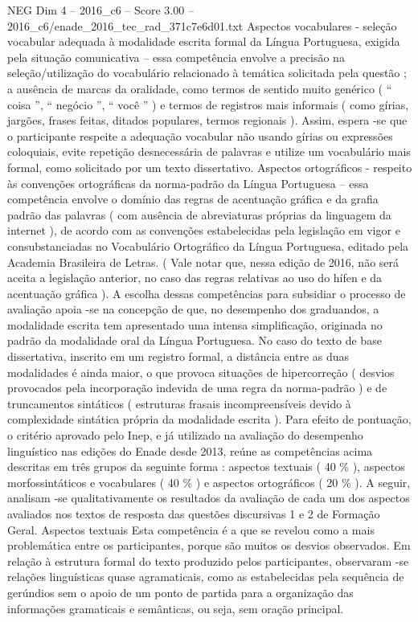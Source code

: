 \begin{textsample}{NEG Dim 4 – 2016\_c6 – Score 3.00 – 2016\_c6/enade\_2016\_tec\_rad\_371c7e6d01.txt}
Aspectos vocabulares - seleção vocabular adequada à modalidade escrita formal da Língua Portuguesa, exigida pela situação comunicativa – essa competência envolve a precisão na seleção/utilização do vocabulário relacionado à temática solicitada pela questão ; a ausência de marcas da oralidade, como termos de sentido muito genérico ( “ coisa ”, “ negócio ”, “ você ” ) e termos de registros mais informais ( como gírias, jargões, frases feitas, ditados populares, termos regionais ).
Assim, espera -se que o participante respeite a adequação vocabular não usando gírias ou expressões coloquiais, evite repetição desnecessária de palavras e utilize um vocabulário mais formal, como solicitado por um texto dissertativo.
Aspectos ortográficos - respeito às convenções ortográficas da norma-padrão da Língua Portuguesa – essa competência envolve o domínio das regras de acentuação gráfica e da grafia padrão das palavras ( com ausência de abreviaturas próprias da linguagem da internet ), de acordo com as convenções estabelecidas pela legislação em vigor e consubstanciadas no Vocabulário Ortográfico da Língua Portuguesa, editado pela Academia Brasileira de Letras. ( Vale notar que, nessa edição de 2016, não será aceita a legislação anterior, no caso das regras relativas ao uso do hífen e da acentuação gráfica ).
A escolha dessas competências para subsidiar o processo de avaliação apoia -se na concepção de que, no desempenho dos graduandos, a modalidade escrita tem apresentado uma intensa simplificação, originada no padrão da modalidade oral da Língua Portuguesa.
No caso do texto de base dissertativa, inscrito em um registro formal, a distância entre as duas modalidades é ainda maior, o que provoca situações de hipercorreção ( desvios provocados pela incorporação indevida de uma regra da norma-padrão ) e de truncamentos sintáticos ( estruturas frasais incompreensíveis devido à complexidade sintática própria da modalidade escrita ).
Para efeito de pontuação, o critério aprovado pelo Inep, e já utilizado na avaliação do desempenho linguístico nas edições do Enade desde 2013, reúne as competências acima descritas em três grupos da seguinte forma : aspectos textuais ( 40 \% ), aspectos morfossintáticos e vocabulares ( 40 \% ) e aspectos ortográficos ( 20 \% ).
A seguir, analisam -se qualitativamente os resultados da avaliação de cada um dos aspectos avaliados nos textos de resposta das questões discursivas 1 e 2 de Formação Geral.
Aspectos textuais Esta competência é a que se revelou como a mais problemática entre os participantes, porque são muitos os desvios observados.
Em relação à estrutura formal do texto produzido pelos participantes, observaram -se relações linguísticas quase agramaticais, como as estabelecidas pela sequência de gerúndios sem o apoio de um ponto de partida para a organização das informações gramaticais e semânticas, ou seja, sem oração principal.

\end{textsample}
